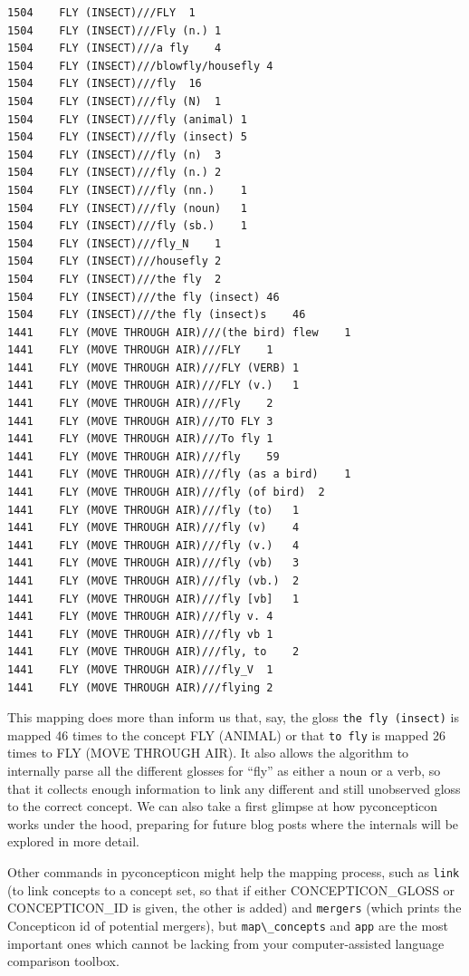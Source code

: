 \documentclass[
  a4paper,
  14pt,
  oneside,
  tablecaptionabove
]{scrbook}
\newcommand{\passthrough}[1]{#1}
\begin{document}
\begin{lstlisting}
1504    FLY (INSECT)///FLY  1
1504    FLY (INSECT)///Fly (n.) 1
1504    FLY (INSECT)///a fly    4
1504    FLY (INSECT)///blowfly/housefly 4
1504    FLY (INSECT)///fly  16
1504    FLY (INSECT)///fly (N)  1
1504    FLY (INSECT)///fly (animal) 1
1504    FLY (INSECT)///fly (insect) 5
1504    FLY (INSECT)///fly (n)  3
1504    FLY (INSECT)///fly (n.) 2
1504    FLY (INSECT)///fly (nn.)    1
1504    FLY (INSECT)///fly (noun)   1
1504    FLY (INSECT)///fly (sb.)    1
1504    FLY (INSECT)///fly_N    1
1504    FLY (INSECT)///housefly 2
1504    FLY (INSECT)///the fly  2
1504    FLY (INSECT)///the fly (insect) 46
1504    FLY (INSECT)///the fly (insect)s    46
1441    FLY (MOVE THROUGH AIR)///(the bird) flew    1
1441    FLY (MOVE THROUGH AIR)///FLY    1
1441    FLY (MOVE THROUGH AIR)///FLY (VERB) 1
1441    FLY (MOVE THROUGH AIR)///FLY (v.)   1
1441    FLY (MOVE THROUGH AIR)///Fly    2
1441    FLY (MOVE THROUGH AIR)///TO FLY 3
1441    FLY (MOVE THROUGH AIR)///To fly 1
1441    FLY (MOVE THROUGH AIR)///fly    59
1441    FLY (MOVE THROUGH AIR)///fly (as a bird)    1
1441    FLY (MOVE THROUGH AIR)///fly (of bird)  2
1441    FLY (MOVE THROUGH AIR)///fly (to)   1
1441    FLY (MOVE THROUGH AIR)///fly (v)    4
1441    FLY (MOVE THROUGH AIR)///fly (v.)   4
1441    FLY (MOVE THROUGH AIR)///fly (vb)   3
1441    FLY (MOVE THROUGH AIR)///fly (vb.)  2
1441    FLY (MOVE THROUGH AIR)///fly [vb]   1
1441    FLY (MOVE THROUGH AIR)///fly v. 4
1441    FLY (MOVE THROUGH AIR)///fly vb 1
1441    FLY (MOVE THROUGH AIR)///fly, to    2
1441    FLY (MOVE THROUGH AIR)///fly_V  1
1441    FLY (MOVE THROUGH AIR)///flying 2
\end{lstlisting}

This mapping does more than inform us that, say, the gloss
\passthrough{\lstinline!the fly (insect)!} is mapped 46 times to the
concept FLY (ANIMAL) or that \passthrough{\lstinline!to fly!} is mapped
26 times to FLY (MOVE THROUGH AIR). It also allows the algorithm to
internally parse all the different glosses for \enquote{fly} as either a
noun or a verb, so that it collects enough information to link any
different and still unobserved gloss to the correct concept. We can also
take a first glimpse at how pyconcepticon works under the hood,
preparing for future blog posts where the internals will be explored in
more detail.

Other commands in pyconcepticon might help the mapping process, such as
\passthrough{\lstinline!link!} (to link concepts to a concept set, so
that if either CONCEPTICON\_GLOSS or CONCEPTICON\_ID is given, the other
is added) and \passthrough{\lstinline!mergers!} (which prints the
Concepticon id of potential mergers), but
\passthrough{\lstinline!map\_concepts!} and
\passthrough{\lstinline!app!} are the most important ones which cannot
be lacking from your computer-assisted language comparison toolbox.
\end{document}
